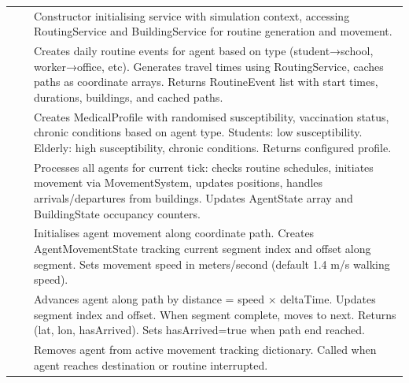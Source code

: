 \begin{longtable}{|L{4cm}|L{4cm}|L{6cm}|}
 & 
 & 
Constructor initialising service with simulation context, accessing RoutingService and BuildingService for routine generation and movement. \\
&  & 
Creates daily routine events for agent based on type (student→school, worker→office, etc). Generates travel times using RoutingService, caches paths as coordinate arrays. Returns RoutineEvent list with start times, durations, buildings, and cached paths. \\
&  & 
Creates MedicalProfile with randomised susceptibility, vaccination status, chronic conditions based on agent type. Students: low susceptibility. Elderly: high susceptibility, chronic conditions. Returns configured profile. \\
&  & 
Processes all agents for current tick: checks routine schedules, initiates movement via MovementSystem, updates positions, handles arrivals/departures from buildings. Updates AgentState array and BuildingState occupancy counters. \\
\hline

 & 
 & 
Initialises agent movement along coordinate path. Creates AgentMovementState tracking current segment index and offset along segment. Sets movement speed in meters/second (default 1.4 m/s walking speed). \\
&  & 
Advances agent along path by distance = speed × deltaTime. Updates segment index and offset. When segment complete, moves to next. Returns (lat, lon, hasArrived). Sets hasArrived=true when path end reached. \\
&  & 
Removes agent from active movement tracking dictionary. Called when agent reaches destination or routine interrupted. \\
\hline


\end{longtable}
